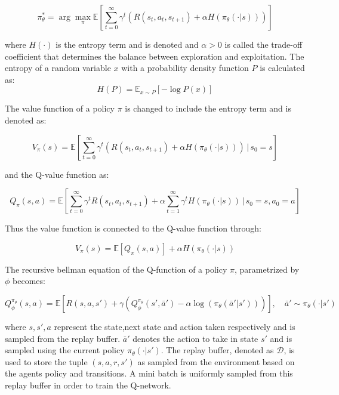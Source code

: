 \begin{equation}
	\pi^*_{\theta} = \arg \max_{\pi} \mathbb{E} \left[\sum_{t=0}^{\infty} \gamma^t \left( R(s_t, a_t, s_{t+1}) + \alpha H(\pi_{\theta}(\cdot|s)) \right) \right]
\end{equation}


where $H(\cdot)$ is the entropy term and is denoted and $\alpha > 0$ is called the trade-off coefficient that determines the balance between exploration and exploitation. The entropy of a random variable $x$ with a probability density function $P$ is calculated as:
\begin{equation}
	H(P) = \mathbb{E}_{x \sim P}[-\log P(x)]
\end{equation}

 The value function of a policy $\pi$ is changed to include the entropy term and is denoted as:

\begin{equation}
	V_{\pi}(s) = \mathbb{E} \left[\sum_{t=0}^{\infty} \gamma^t \left( R(s_t, a_t, s_{t+1}) + \alpha H(\pi_{\theta}(\cdot|s)) \right) \,\Bigg|\, s_0 = s \right]
\end{equation}


and the Q-value function as:

\begin{equation}
	Q_{\pi}(s,a) = \mathbb{E} \left[\sum_{t=0}^{\infty} \gamma^t R(s_t, a_t, s_{t+1}) + \alpha \sum_{t=1}^{\infty} \gamma^t H(\pi_{\theta}(\cdot|s)) \,\Bigg|\, s_0 = s, a_0 = a \right]
\end{equation}

Thus the value function is connected to the Q-value function through:

\begin{equation}\label{eq:sac-value-function}
	V_{\pi} (s) = \mathbb{E} \left[Q_{\pi}(s,a) \right] + \alpha H(\pi_{\theta}(\cdot|s))
\end{equation}

The recursive bellman equation of the Q-function of a policy $\pi$, parametrized by $\phi$ becomes:

\begin{equation}
	Q_{\phi}^{\pi_{\theta}}(s,a) = \mathbb{E} \left[ R(s,a,s') + \gamma (Q_{\phi}^{\pi_{\theta}}(s',\bar{a}') - \alpha \log (\pi_{\theta}(\bar{a}'|s')))\right], \quad \bar{a}' \sim \pi_{\theta}(\cdot | s')
\end{equation}

where $s,s',a$ represent the state,next state and action taken respectively and is sampled from the replay buffer. $\bar{a}'$ denotes the action to take in state $s'$ and is sampled using the current policy $\pi_{\theta}(\cdot | s')$. The replay buffer, denoted as $\mathcal{D}$, is used to store the tuple $(s,a,r,s')$ as sampled from the environment based on the agents policy and transitions. A mini batch is uniformly sampled from this replay buffer in order to train the Q-network.


